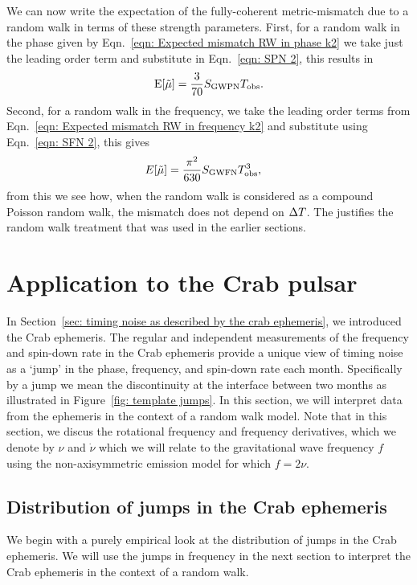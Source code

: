 \documentclass[../full_thesis/full_thesis.tex]{subfiles}
\begin{document}
We can now write the expectation of the fully-coherent metric-mismatch due to
a random walk in terms of these strength parameters. First, for a random walk
in the phase given by Eqn.~\eqref{eqn: Expected mismatch RW in phase k2} we
take just the leading order term and substitute in Eqn.~\eqref{eqn: SPN 2},
this results in
\begin{align}
\textrm{E}[\tilde{\mu}] = \frac{3}{70} S_{\textrm{GWPN}} T_{\mathrm{obs}}.
\label{eqn: mu prediction phase}
\end{align}
Second, for a random walk in the frequency, we take the leading order terms
from Eqn.~\eqref{eqn: Expected mismatch RW in frequency k2} and substitute
using Eqn.~\eqref{eqn: SFN 2}, this gives
\begin{align}
E[\tilde{\mu}] & = \frac{\pi^{2}}{630} S_{\textrm{GWFN}} T_{\mathrm{obs}}^{3},
\label{eqn: mu prediction}
\end{align}
from this we see how, when the random walk is considered as a compound Poisson
random walk, the mismatch does not depend on $\Delta T$. The justifies the
random walk treatment that was used in the earlier sections.

\section{Application to the Crab pulsar}
\label{sec: application to the crab}
In Section~\ref{sec: timing noise as described by the crab ephemeris}, we
introduced the Crab ephemeris.  The regular and independent measurements of the
frequency and spin-down rate in the Crab ephemeris provide a unique view of
timing noise as a `jump' in the phase, frequency, and spin-down rate each
month. Specifically by a jump we mean the discontinuity at the interface
between two months as illustrated in Figure~\ref{fig: template jumps}. In this
section, we will interpret data from the ephemeris in the context of a random
walk model. Note that in this section,
we discus the rotational frequency and frequency derivatives, which we denote
by $\nu$ and $\dot{\nu}$ which we will relate to the gravitational wave
frequency $f$ using the non-axisymmetric emission model for which $f=2\nu$.

\subsection{Distribution of jumps in the Crab ephemeris}
\label{sec: jumps}
\newcommand{\nuddotav}{\ddot{\nu}_{\textrm{av}}}
We begin with a purely empirical look at the distribution of jumps in the
Crab ephemeris. We will use the jumps in frequency in the next section to interpret the
Crab ephemeris in the context of a random walk.
\end{document}
